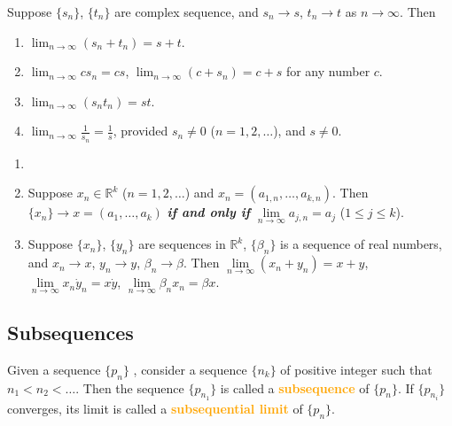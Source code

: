 \begin{theorem}
Suppose $\{s_n\}$, $\{t_n\}$ are complex sequence, and $s_n\to s$, $t_n\to t$ as $n\to \infty$. Then
\begin{enumerate}[label={(\arabic*)}]
\item $\displaystyle \lim_{n\to \infty}(s_n+t_n)=s+t$.
\item $\displaystyle \lim_{n\to \infty}cs_n=cs$, $\lim_{n\to \infty}(c+s_n)=c+s$ for any number $c$.
\item $\displaystyle \lim_{n\to \infty}(s_nt_n)=st$.
\item $\displaystyle \lim_{n\to \infty}\frac{1}{s_n}=\frac{1}{s}$, provided $s_n\neq 0$ ($n=1,2,\dots$), and $s\neq 0$.
\end{enumerate}
\end{theorem}

\begin{theorem}
\begin{enumerate}[label={(\alph*)}]
\item[]
\item Suppose $x_n\in \mathbb{R}^k$ ($n=1,2,\dots$) and $x_n=(a_{1,n}, \dots, a_{k,n})$. Then $\{x_n\}\to x=(a_1,\dots,a_k)$ \textbf{\emph{if and only if}} $\lim\limits_{n\to \infty}a_{j,n}=a_j$ ($1\leq j\leq k$).
\item Suppose $\{x_n\}$, $\{y_n\}$ are sequences in $\mathbb{R}^k$, $\{\beta_n\}$ is a sequence of real numbers, and $x_n \to x$, $y_n\to y$, $\beta_n\to \beta$. Then $\lim\limits_{n\to \infty}(x_n+y_n)=x+y$, $\lim\limits_{n\to \infty}x_n\dot y_n=x\dot y$, $\lim\limits_{n\to \infty}\beta_nx_n=\beta x$.
\end{enumerate} 
\end{theorem}

\subsection{Subsequences}

\begin{definition}
Given a sequence $\{p_n\}$ , consider a sequence $\{n_k\}$ of positive integer such that $n_1<n_2<\dots$. Then the sequence $\{p_{n_1}\}$ is called a \textbf{\textcolor{orange}{subsequence}} of $\{p_n\}$. If $\{p_{n_i}\}$ converges, its limit is called a \textbf{\textcolor{orange}{subsequential limit}} of $\{p_n\}$.
\end{definition}

